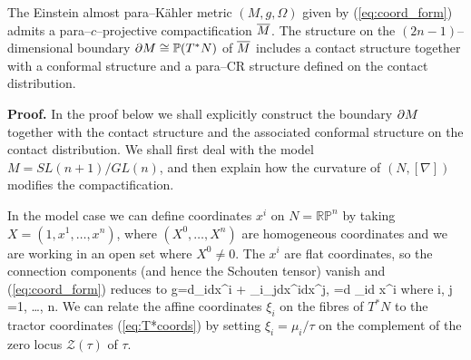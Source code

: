 


\begin{theo}
\label{our_thm}
The Einstein almost para--K\"ahler metric $(M, g, \Omega)$ given by 
(\ref{eq:coord_form}) admits a para--$c$--projective compactification
$\overline{M}$. The structure on the
$(2n-1)$--dimensional boundary $\partial M\cong \mathbb{P}(T^* N)$ of $\overline{M}$ includes a contact structure together with a conformal structure 
and a para--CR structure
defined on the contact distribution.
\end{theo}
\noindent
{\bf Proof.}
In the proof below we shall explicitly construct the boundary $\partial M$ together with the contact structure and the associated conformal structure on the contact distribution. We shall
first deal with the model $M=SL(n+1)/GL(n)$, and then explain how the curvature
of $(N, [\nabla])$ modifies the compactification.

In the model case we can define coordinates $x^i$ on $N=\mathbb{RP}^n$ by taking $X=(1,x^1,\dots,x^n)$, where $(X^0,\dots,X^n)$ are homogeneous coordinates and we are working in an open set where $X^0\neq 0$. The ${x^i}$ are flat coordinates, so the connection components (and hence the Schouten tensor) vanish and (\ref{eq:coord_form}) reduces to
\be
\label{model_metric}
g=d\xi_i\odot dx^i + \xi_i\xi_jdx^i\odot dx^j, \qquad
\Omega=d \xi_i\wedge d x^i \quad
\mbox{where}\quad
i, j =1, \dots, n.
\ee
We can relate \cite{DM} the affine coordinates $\xi_i$ on the fibres of $T^*N$ to the tractor coordinates (\ref{eq:T*coords}) by setting $\xi_i=\mu_i/\tau$ on the complement of the zero locus ${\mathcal Z}(\tau)$ of $\tau$.

